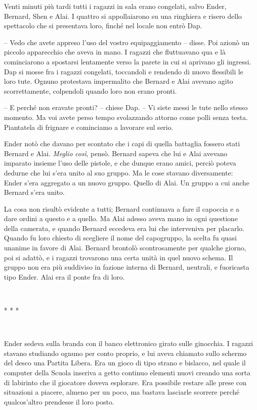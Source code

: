 {Venti minuti più tardi tutti i ragazzi in sala erano congelati, salvo
	Ender, Bernard, Shen e Alai. I quattro si appollaiarono su una ringhiera
	e risero dello spettacolo che si presentava loro, finché nel locale non
	entrò Dap.}

{-- Vedo che avete appreso l'uso del vostro equipaggiamento -- disse.
	Poi azionò un piccolo apparecchio che aveva in mano. I ragazzi che
	fluttuavano qua e là cominciarono a spostarsi lentamente verso la parete
	in cui si aprivano gli ingressi. Dap si mosse fra i ragazzi congelati,
	toccandoli e rendendo di nuovo flessibili le loro tute. Ognuno
	protestava impermalito che Bernard e Alai avevano agito scorrettamente,
	colpendoli quando loro non erano pronti.}

{-- E perché non eravate pronti? -- chiese Dap. -- Vi siete messi le
	tute nello stesso momento. Ma voi avete perso tempo svolazzando attorno
	come polli senza testa. Piantatela di frignare e cominciamo a lavorare
	sul serio.}

{Ender notò che davano per scontato che i capi di quella battaglia
	fossero stati Bernard e Alai. \emph{Meglio così}, \emph{} pensò. Bernard
	sapeva che lui e Alai avevano imparato insieme l'uso delle pistole, e
	che dunque erano amici, perciò poteva dedurne che lui s'era unito al suo
	gruppo. Ma le cose stavano diversamente: Ender s'era aggregato a un
	nuovo gruppo. Quello di Alai. Un gruppo a cui anche Bernard s'era
	unito.}

{La cosa non risultò evidente a tutti; Bernard continuava a fare il
	capoccia e a dare ordini a questo e a quello. Ma Alai adesso aveva mano
	in ogni questione della camerata, e quando Bernard eccedeva era lui che
	interveniva per placarlo. Quando fu loro chiesto di scegliere il nome
	del capogruppo, la scelta fu quasi unanime in favore di Alai. Bernard
	brontolò scontrosamente per qualche giorno, poi si adattò, e i ragazzi
	trovarono una certa unità in quel nuovo schema. Il gruppo non era più
	suddiviso in fazione interna di Bernard, neutrali, e fuoricasta tipo
	Ender. Alai era il ponte fra di loro.}

{~}

\begin{center}
	{* * *}
\end{center}

{~}

{Ender sedeva sulla branda con il banco elettronico girato sulle
	ginocchia. I ragazzi stavano studiando ognuno per conto proprio, e lui
	aveva chiamato sullo schermo del desco una Partita Libera. Era un gioco
	di tipo strano e bislacco, nel quale il computer della Scuola inseriva a
	getto continuo elementi nuovi creando una sorta di labirinto che il
	giocatore doveva esplorare. Era possibile restare alle prese con
	situazioni a piacere, almeno per un poco, ma bastava lasciarle scorrere
	perché qualcos'altro prendesse il loro posto.}

